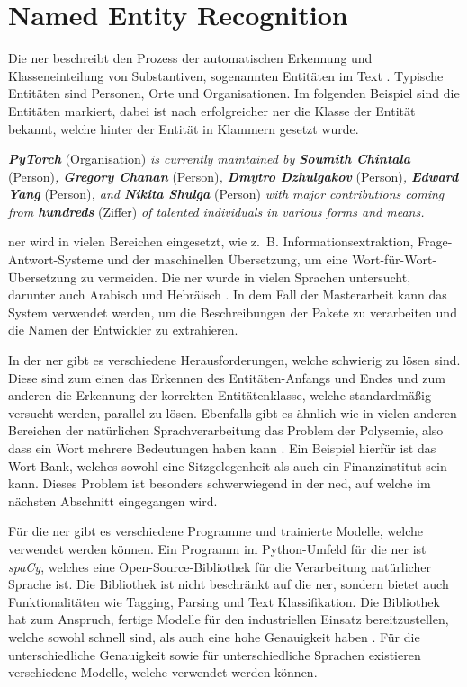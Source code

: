 \section{Named Entity Recognition}
\label{sec:named-entity-recognition}
Die \gls{ner} beschreibt den Prozess der automatischen Erkennung und Klasseneinteilung von Substantiven, sogenannten Entitäten im Text \autocite{mohit_named_2014}.
Typische Entitäten sind Personen, Orte und Organisationen.
Im folgenden Beispiel sind die Entitäten markiert, dabei ist nach erfolgreicher \gls{ner} die Klasse der Entität bekannt, welche hinter der Entität in Klammern gesetzt wurde.

\begin{addmargin}[25pt]{0pt}
    \emph{\textbf{PyTorch}} (Organisation) \emph{is currently maintained by \textbf{Soumith Chintala}} (Person)\emph{, \textbf{Gregory Chanan}} (Person)\emph{, \textbf{Dmytro Dzhulgakov}} (Person)\emph{, \textbf{Edward Yang}} (Person)\emph{, and \textbf{Nikita Shulga}} (Person) \emph{with major contributions coming from \textbf{hundreds}} (Ziffer) \emph{of talented individuals in various forms and means.}
\end{addmargin}

\gls{ner} wird in vielen Bereichen eingesetzt, wie z. B. Informationsextraktion, Frage-Antwort-Systeme und der maschinellen Übersetzung, um eine Wort-für-Wort-Übersetzung zu vermeiden.
Die \gls{ner} wurde in vielen Sprachen untersucht, darunter auch Arabisch und Hebräisch \autocite{mohit_named_2014}.
In dem Fall der Masterarbeit kann das System verwendet werden, um die Beschreibungen der Pakete zu verarbeiten und die Namen der Entwickler zu extrahieren.

In der \gls{ner} gibt es verschiedene Herausforderungen, welche schwierig zu lösen sind.
Diese sind zum einen das Erkennen des Entitäten-Anfangs und Endes und zum anderen die Erkennung der korrekten Entitätenklasse, welche standardmäßig versucht werden, parallel zu lösen.
Ebenfalls gibt es ähnlich wie in vielen anderen Bereichen der natürlichen Sprachverarbeitung das Problem der Polysemie, also dass ein Wort mehrere Bedeutungen haben kann \autocite{mohit_named_2014}.
Ein Beispiel hierfür ist das Wort \glqq Bank\grqq{}, welches sowohl eine Sitzgelegenheit als auch ein Finanzinstitut sein kann.
Dieses Problem ist besonders schwerwiegend in der \gls{ned}, auf welche im nächsten Abschnitt eingegangen wird.

Für die \gls{ner} gibt es verschiedene Programme und trainierte Modelle, welche verwendet werden können.
Ein Programm im Python-Umfeld für die \gls{ner} ist \emph{spaCy}, welches eine Open-Source-Bibliothek für die Verarbeitung natürlicher Sprache ist.
Die Bibliothek ist nicht beschränkt auf die \gls{ner}, sondern bietet auch Funktionalitäten wie Tagging, Parsing und Text Klassifikation.
Die Bibliothek hat zum Anspruch, fertige Modelle für den industriellen Einsatz bereitzustellen, welche sowohl schnell sind, als auch eine hohe Genauigkeit haben \autocite{honnibal_spacy_2020}.
Für die unterschiedliche Genauigkeit sowie für unterschiedliche Sprachen existieren verschiedene Modelle, welche verwendet werden können.
